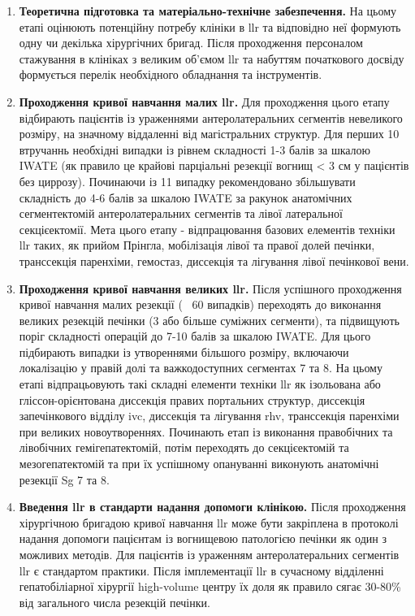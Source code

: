 \begin{enumerate}
    
   \item \textbf{Теоретична підготовка та матеріально-технічне забезпечення.} На цьому етапі оцінюють потенційну потребу клініки в \acrshort{llr} та відповідно неї формують одну чи декілька хірургічних бригад. Після проходження персоналом стажування в клініках з великим об'ємом \acrshort{llr} та набуттям початкового досвіду формується перелік необхідного обладнання та інструментів. 
    
   \item \textbf{Проходження кривої навчання малих \acrshort{llr}.} Для проходження цього етапу відбирають пацієнтів із ураженнями антеролатеральних сегментів невеликого розміру, на значному віддаленні від магістральних структур. Для перших 10 втручаннь необхідні випадки із рівнем складності 1-3 балів за шкалою IWATE (як правило це крайові парціальні резекції вогнищ < 3 см у пацієнтів без циррозу). Починаючи із 11 випадку рекомендовано збільшувати складність до 4-6 балів за шкалою IWATE за ракунок анатомічних сегментектомій антеролатеральних сегментів та лівої латеральної секцієектомії. Мета цього етапу - відпрацювання базових елементів техніки \acrshort{llr} таких, як прийом Прінгла, мобілізація лівої та правої долей печінки, транссекція паренхіми, гемостаз, диссекція та лігування лівої печінкової вени.
    
   \item \textbf{Проходження кривої навчання великих \acrshort{llr}.} Після успішного проходження кривої навчання малих резекції (~ 60 випадків) переходять до виконання великих резекцій печінки (3 або більше суміжних сегменти), та підвищують поріг складності операцій до 7-10 балів за шкалою IWATE. Для цього підбирають випадки із утвореннями більшого розміру, включаючи локалізацію у правій долі та важкодоступних сегментах 7 та 8. На цьому етапі відпрацьовують такі складні елементи техніки \acrshort{llr} як  ізольована або гліссон-орієнтована диссекція правих портальних структур, диссекція запечінкового відділу \acrshort{ivc}, диссекція та лігування \acrshort{rhv}, транссекція паренхіми при великих новоутвореннях. Починають етап із виконання правобічних та лівобічних гемігепатектомій, потім переходять до секцієектомій та мезогепатектомій та при їх успішному опануванні виконують анатомічні резекції Sg 7 та 8. 
    
   \item \textbf{Введення \acrshort{llr} в стандарти надання допомоги клінікою.} Після проходження хірургічною бригадою кривої навчання \acrshort{llr} може бути закріплена в протоколі надання допомоги пацієнтам із вогнищевою патологією печінки як один з можливих методів. Для пацієнтів із ураженням антеролатеральних сегментів \acrshort{llr} є стандартом практики. Після імплементації \acrshort{llr} в сучасному відділенні гепатобіліарної хірургії high-volume центру їх доля як правило сягає 30-80\% від загального числа резекцій печінки. 

\end{enumerate}
